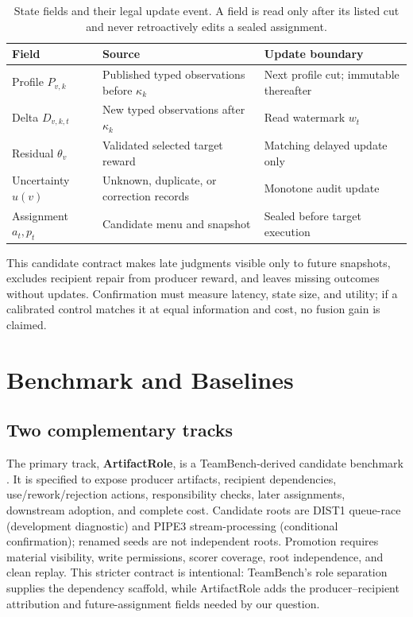 \documentclass[sigconf,anonymous]{aamas}
\begin{document}
\begin{table}[t]
\centering\scriptsize
\setlength{\tabcolsep}{2pt}
\caption{State fields and their legal update event. A field is read only after its listed cut and never retroactively edits a sealed assignment.}
\label{tab:state-contract}
\begin{tabular}{p{}p{}p{}}
\toprule
Field & Source & Update boundary \\
\midrule
Profile $P_{v,k}$ & Published typed observations before $\kappa_k$ & Next profile cut; immutable thereafter \\
Delta $D_{v,k,t}$ & New typed observations after $\kappa_k$ & Read watermark $w_t$ \\
Residual $\theta_v$ & Validated selected target reward & Matching delayed update only \\
Uncertainty $u(v)$ & Unknown, duplicate, or correction records & Monotone audit update \\
Assignment $a_t,p_t$ & Candidate menu and snapshot & Sealed before target execution \\
\bottomrule
\end{tabular}
\end{table}

This candidate contract makes late judgments visible only to future snapshots, excludes recipient repair from producer reward, and leaves missing outcomes without updates. Confirmation must measure latency, state size, and utility; if a calibrated control matches it at equal information and cost, no fusion gain is claimed.

\section{Benchmark and Baselines}
\label{sec:benchmark}

\subsection{Two complementary tracks}
The primary track, \textbf{ArtifactRole}, is a TeamBench-derived candidate benchmark \cite{kim2026teambench}. It is specified to expose producer artifacts, recipient dependencies, use/rework/rejection actions, responsibility checks, later assignments, downstream adoption, and complete cost. Candidate roots are DIST1 queue-race (development diagnostic) and PIPE3 stream-processing (conditional confirmation); renamed seeds are not independent roots. Promotion requires material visibility, write permissions, scorer coverage, root independence, and clean replay. This stricter contract is intentional: TeamBench's role separation supplies the dependency scaffold, while ArtifactRole adds the producer--recipient attribution and future-assignment fields needed by our question.
\end{document}
